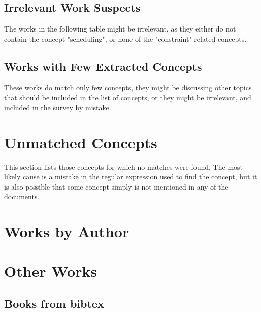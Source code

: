 \documentclass[a4paper]{article}
\begin{document}




\subsection{Irrelevant Work Suspects}
The works in the following table might be irrelevant, as they either do not contain the concept "scheduling", or none of the "constraint" related concepts.




\subsection{Works with Few Extracted Concepts}

These works do match only few concepts, they might be discussing other topics that should be included in the list of concepts, or they might be irrelevant, and included in the survey by mistake.




\clearpage
\section{Unmatched Concepts}

This section lists those concepts for which no matches were found. The most likely cause is a mistake in the regular expression used to find the concept, but it is also possible that some concept simply is not mentioned in any of the documents. 



\clearpage
\section{Works by Author}



\clearpage
\section{Other Works}

\clearpage
\subsection{Books from bibtex}

\end{document}
